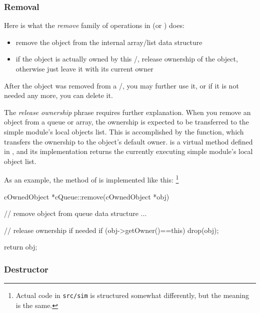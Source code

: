 \subsubsection{Removal}
\label{sec:sim-lib:ownership-and-removal-from-container}

Here is what the \textit{remove} family of operations in 
(or ) does:

\begin{itemize}
    \item remove the object from the internal array/list data structure

    \item if the object is actually owned by this /,
    release ownership of the object, otherwise just leave it with
    its current owner
\end{itemize}

After the object was removed from a /,
you may further use it, or if it is not needed any more, you can delete it.

The \textit{release ownership} phrase requires further explanation.
When you remove an object from a queue or array, the ownership
is expected to be transferred to the simple module's local objects list.
This is accomplished by the  function, which transfers the
ownership to the object's default owner.
 is a virtual method defined in ,
and its implementation returns
the currently executing simple module's local object list.

As an example, the  method of  is
implemented like this:
  \footnote{Actual code in \texttt{src/sim} is structured somewhat
  differently, but the meaning is the same.}

\begin{cpp}
cOwnedObject *cQueue::remove(cOwnedObject *obj)
{
    // remove object from queue data structure
    ...

    // release ownership if needed
    if (obj->getOwner()==this)
        drop(obj);

    return obj;
}
\end{cpp}


\subsubsection{Destructor}
\label{sec:sim-lib:ownership-and-container-destructor}

